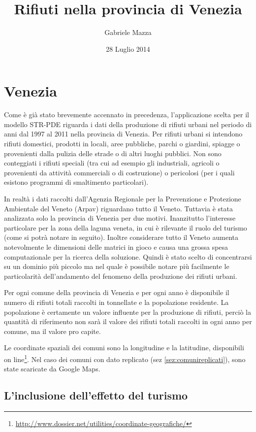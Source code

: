 \documentclass[a4paper,11pt,twoside,openright]{book}							%
\date{28 Luglio 2014}
\author{Gabriele Mazza}
\title{Rifiuti nella provincia di Venezia}
\begin{document}

\chapter{Venezia}

Come è già stato brevemente accennato in precedenza, l'applicazione scelta per il modello STR-PDE riguarda i dati della produzione di rifiuti urbani nel periodo di anni dal 1997 al 2011 nella provincia di Venezia. Per rifiuti urbani si intendono rifiuti domestici, prodotti in locali, aree pubbliche, parchi o giardini, spiagge o provenienti dalla pulizia delle strade o di altri luoghi pubblici. Non sono conteggiati i rifiuti speciali (tra cui ad esempio gli industriali, agricoli o provenienti da attività commerciali o di costruzione) o pericolosi (per i quali esistono programmi di smaltimento particolari).

In realtà i dati raccolti dall'Agenzia Regionale per la Prevenzione e Protezione Ambientale del Veneto (Arpav) riguardano tutto il Veneto. Tuttavia è stata analizzata solo la provincia di Venezia per due motivi. Inanzitutto l'interesse particolare per la zona della laguna veneta, in cui è rilevante il ruolo del turismo (come si potrà notare in seguito). Inoltre considerare tutto il Veneto aumenta notevolmente le dimensioni delle matrici in gioco e causa una grossa spesa computazionale per la ricerca della soluzione. Quindi è stato scelto di concentrarsi su un dominio più piccolo ma nel quale è possibile notare più facilmente le particolarità dell'andamento del fenomeno della produzione dei rifiuti urbani.

Per ogni comune della provincia di Venezia e per ogni anno è disponibile il numero di rifiuti totali raccolti in tonnellate e la popolazione residente. La popolazione è certamente un valore influente per la produzione di rifiuti, perciò la quantità di riferimento non sarà il valore dei rifiuti totali raccolti in ogni anno per comune, ma il valore pro capite.

Le coordinate spaziali dei comuni sono la longitudine e la latitudine, disponibili on line\footnote{\href{http://www.dossier.net/utilities/coordinate-geografiche/}{http://www.dossier.net/utilities/coordinate-geografiche/}}. Nel caso dei comuni con dato replicato (sez \ref{sez:comunireplicati}), sono state scaricate da Google Maps.


\section{L'inclusione dell'effetto del turismo}
\end{document}
